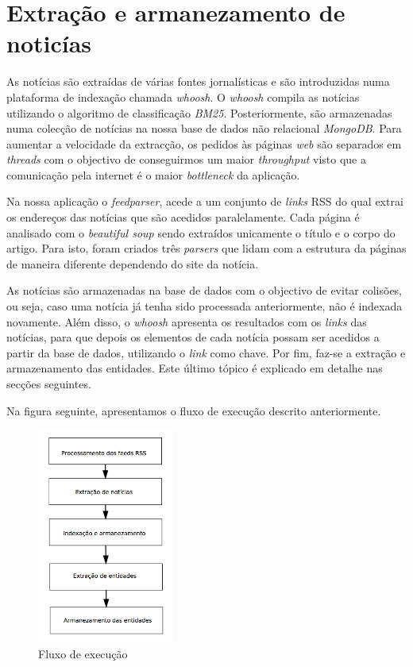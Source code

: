 \section{Extração e armanezamento de noticías}
As notícias são extraídas de várias fontes jornalísticas e são introduzidas numa plataforma de indexação chamada \textit{whoosh}. O \textit{whoosh} compila as notícias utilizando o algoritmo de classificação \textit{BM25}. Posteriormente, são armazenadas numa colecção de notícias na nossa base de dados não relacional \textit{MongoDB}. Para aumentar a velocidade da extracção, os pedidos às páginas \textit{web} são separados em \textit{threads} com o objectivo de conseguirmos um maior \textit{throughput} visto que a comunicação pela internet é o maior \textit{bottleneck} da aplicação.

Na nossa aplicação o \textit{feedparser}, acede a um conjunto de \textit{links} RSS do qual extrai os endereços das notícias que são acedidos paralelamente. Cada página é analisado com o \textit{beautiful soup} sendo extraídos unicamente o título e o corpo do artigo. Para isto, foram criados três \textit{parsers} que lidam com a estrutura da páginas de maneira diferente dependendo do site da notícia.

As notícias são armazenadas na base de dados com o objectivo de evitar colisões, ou seja, caso uma notícia já tenha sido processada anteriormente, não é indexada novamente. Além disso, o \textit{whoosh} apresenta os resultados com os \textit{links} das notícias, para que depois os elementos de cada notícia possam ser acedidos a partir da base de dados, utilizando o \textit{link} como chave. Por fim, faz-se a extração e armazenamento das entidades. Este último tópico é explicado em detalhe nas secções seguintes.

Na figura seguinte, apresentamos o fluxo de execução descrito anteriormente.

\begin{figure}[htbp]
  \centering
    \includegraphics[width=0.4\textwidth]{images/fluxo.png}
    \caption{Fluxo de execução}
\end{figure}

